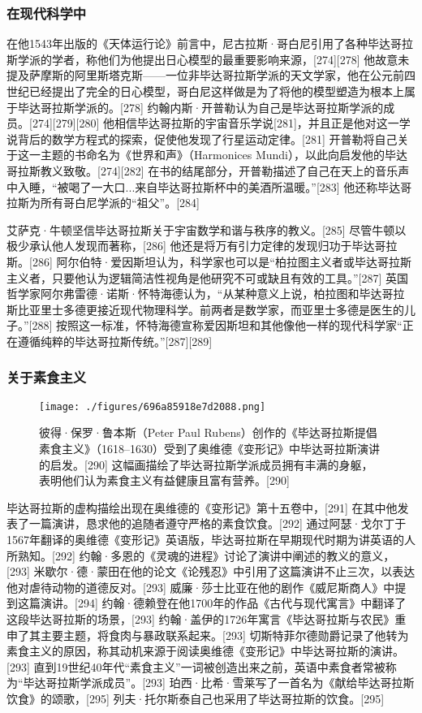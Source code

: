 \subsubsection{在现代科学中}
在他1543年出版的《天体运行论》前言中，尼古拉斯·哥白尼引用了各种毕达哥拉斯学派的学者，称他们为他提出日心模型的最重要影响来源，[274][278] 他故意未提及萨摩斯的阿里斯塔克斯——一位非毕达哥拉斯学派的天文学家，他在公元前四世纪已经提出了完全的日心模型，哥白尼这样做是为了将他的模型塑造为根本上属于毕达哥拉斯学派的。[278] 约翰内斯·开普勒认为自己是毕达哥拉斯学派的成员。[274][279][280] 他相信毕达哥拉斯的宇宙音乐学说[281]，并且正是他对这一学说背后的数学方程式的探索，促使他发现了行星运动定律。[281] 开普勒将自己关于这一主题的书命名为《世界和声》（Harmonices Mundi），以此向启发他的毕达哥拉斯教义致敬。[274][282] 在书的结尾部分，开普勒描述了自己在天上的音乐声中入睡，“被喝了一大口...来自毕达哥拉斯杯中的美酒所温暖。”[283] 他还称毕达哥拉斯为所有哥白尼学派的“祖父”。[284]

艾萨克·牛顿坚信毕达哥拉斯关于宇宙数学和谐与秩序的教义。[285] 尽管牛顿以极少承认他人发现而著称，[286] 他还是将万有引力定律的发现归功于毕达哥拉斯。[286] 阿尔伯特·爱因斯坦认为，科学家也可以是“柏拉图主义者或毕达哥拉斯主义者，只要他认为逻辑简洁性视角是他研究不可或缺且有效的工具。”[287] 英国哲学家阿尔弗雷德·诺斯·怀特海德认为，“从某种意义上说，柏拉图和毕达哥拉斯比亚里士多德更接近现代物理科学。前两者是数学家，而亚里士多德是医生的儿子。”[288] 按照这一标准，怀特海德宣称爱因斯坦和其他像他一样的现代科学家“正在遵循纯粹的毕达哥拉斯传统。”[287][289]
\subsubsection{关于素食主义}
\begin{figure}[ht]
\centering
\texttt{[image: ./figures/696a85918e7d2088.png]}
\caption{彼得·保罗·鲁本斯（Peter Paul Rubens）创作的《毕达哥拉斯提倡素食主义》（1618–1630）受到了奥维德《变形记》中毕达哥拉斯演讲的启发。[290] 这幅画描绘了毕达哥拉斯学派成员拥有丰满的身躯，表明他们认为素食主义有益健康且富有营养。[290]} \label{fig_Pythag_17}
\end{figure}
毕达哥拉斯的虚构描绘出现在奥维德的《变形记》第十五卷中，[291] 在其中他发表了一篇演讲，恳求他的追随者遵守严格的素食饮食。[292] 通过阿瑟·戈尔丁于1567年翻译的奥维德《变形记》英语版，毕达哥拉斯在早期现代时期为讲英语的人所熟知。[292] 约翰·多恩的《灵魂的进程》讨论了演讲中阐述的教义的意义，[293] 米歇尔·德·蒙田在他的论文《论残忍》中引用了这篇演讲不止三次，以表达他对虐待动物的道德反对。[293] 威廉·莎士比亚在他的剧作《威尼斯商人》中提到这篇演讲。[294] 约翰·德赖登在他1700年的作品《古代与现代寓言》中翻译了这段毕达哥拉斯的场景，[293] 约翰·盖伊的1726年寓言《毕达哥拉斯与农民》重申了其主要主题，将食肉与暴政联系起来。[293] 切斯特菲尔德勋爵记录了他转为素食主义的原因，称其动机来源于阅读奥维德《变形记》中毕达哥拉斯的演讲。[293] 直到19世纪40年代“素食主义”一词被创造出来之前，英语中素食者常被称为“毕达哥拉斯学派成员”。[293] 珀西·比希·雪莱写了一首名为《献给毕达哥拉斯饮食》的颂歌，[295] 列夫·托尔斯泰自己也采用了毕达哥拉斯的饮食。[295]
